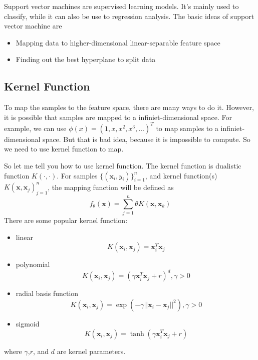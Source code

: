\documentclass{article}
\begin{document}
Support vector machines are supervised learning models\cite{svm-wikipedia}. It's mainly used to classify,
while it can also be use to regression analysis.
The basic ideas of support vector machine are
\begin{itemize}
\item Mapping data to higher-dimensional linear-separable feature space
\item Finding out the best hyperplane to split data
\end{itemize}

\subsection{Kernel Function}
\label{sec:svm:kf}

To map the samples to the feature space, there are many ways to do it.
However, it is possible that samples are mapped to a infiniet-dimensional space.
For example, we can use $\phi(x)=(1,x,x^2,x^3,\dots)^T$ to map samples to a infiniet-dimensional space.
But that is bad idea, because it is impossible to compute.
So we need to use kernel function to map.

So let me tell you how to use kernel function.
The kernel function is dualistic function $K(\cdot,\cdot)$.
For samples $\{(\mathbf{x}_i,y_i)\}^n_{i=1}$, and kernel function(s) $K(\mathbf{x},\mathbf{x}_j)^n_{j=1}$,
the mapping function\cite{GraphML1} will be defined as
\begin{equation}
  \label{eq:mapping}
  f_\theta(\mathbf{x})=\sum\limits_{j=1}^{n}\theta K(\mathbf{x},\mathbf{x}_k)
\end{equation}
There are some popular kernel function:
\begin{itemize}
\item linear
  \begin{equation}
    \label{eq:kf:linear}
    K(\mathbf{x}_i,\mathbf{x}_j) = \mathbf{x}_i^T\mathbf{x}_j
  \end{equation}
\item polynomial
  \begin{equation}
    \label{eq:kf:polynomial}
    K(\mathbf{x}_i,\mathbf{x}_j) = \left(\gamma \mathbf{x}_i^T\mathbf{x}_j+r\right)^d,\gamma > 0
  \end{equation}
\item radial basis function
  \begin{equation}
    \label{eq:kf:rbf}
    K(\mathbf{x}_i,\mathbf{x}_j) = \exp{\left(-\gamma||\mathbf{x}_i-\mathbf{x}_j||^2\right)},\gamma > 0
  \end{equation}
\item sigmoid
  \begin{equation}
    \label{eq:kf:sigmoid}
    K(\mathbf{x}_i,\mathbf{x}_j) = \tanh{\left(\gamma \mathbf{x}_i^T\mathbf{x}_j+r\right)}
  \end{equation}
\end{itemize}
where $\gamma$,$r$, and $d$ are kernel parameters.
\end{document}
